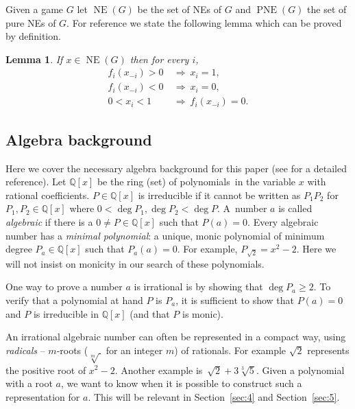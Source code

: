 \documentclass[preprint,12pt,authoryear]{elsarticle}
\newtheorem{lemma}[theorem]{Lemma}
\newcommand{\Q}{\mathbb{Q}}
\DeclareMathOperator{\NE}{NE}
\DeclareMathOperator{\PNE}{PNE}
\begin{document}
Given a game $G$ let $\NE(G)$ be the set of NEs of $G$ and $\PNE(G)$ the set of pure NEs of 
$G$. For reference we state the following lemma which can be proved by definition.

\begin{lemma}\label{lmm:ne-poly-cond}
  If $x\in\NE(G)$ then for every $i$,
  \begin{align}\label{eq:poly-cond}
    f_i(x_{-i})>0&~\Rightarrow~x_i=1,\nonumber\\
    f_i(x_{-i})<0&~\Rightarrow~x_i=0,\\
    0<x_i<1&~\Rightarrow~f_i(x_{-i})=0.\nonumber
  \end{align}
\end{lemma}

\subsection{Algebra background}
Here we cover the necessary algebra background for this paper (see 
\citet{artin2011algebra} for a detailed reference). Let $\Q[x]$ be the ring (set) of 
polynomials~in the variable $x$ with rational coefficients. $P\in\Q[x]$ is irreducible if it cannot be written as 
$P_1P_2$ for $P_1,P_2\in\Q[x]$ where $0<\deg P_1,\deg P_2<\deg P$.
A~number $a$ is called \emph{algebraic} if there is a $0\ne P\in\Q[x]$ such that $P(a)=0$. Every 
algebraic number has a \emph{minimal polynomial}: a unique, monic polynomial of minimum 
degree $P_a\in\Q[x]$ such that $P_a(a)=0$. For example, $P_{\sqrt2}=x^2-2$. Here we will not insist on monicity in our search of these polynomials.

One way to prove a number $a$ is irrational is by showing that $\deg P_a\ge2$. To verify 
that a polynomial at hand $P$ is $P_a$, it is sufficient to show that $P(a)=0$ and $P$ is irreducible in $\Q[x]$ (and that $P$ is monic).

An irrational algebraic number can often be represented in a compact way, using 
\emph{radicals} -- $m$-roots ($\sqrt[m]~$ for an integer $m$) of rationals. For example $\sqrt2$ represents the positive root of 
$x^2-2$. Another example is~$\sqrt2+3\sqrt[3]5$. Given a polynomial with a root $a$, we 
want to know when it is possible to construct such a representation for $a$. This 
will be relevant in Section~\ref{sec:4} and Section~\ref{sec:5}.
\end{document}
